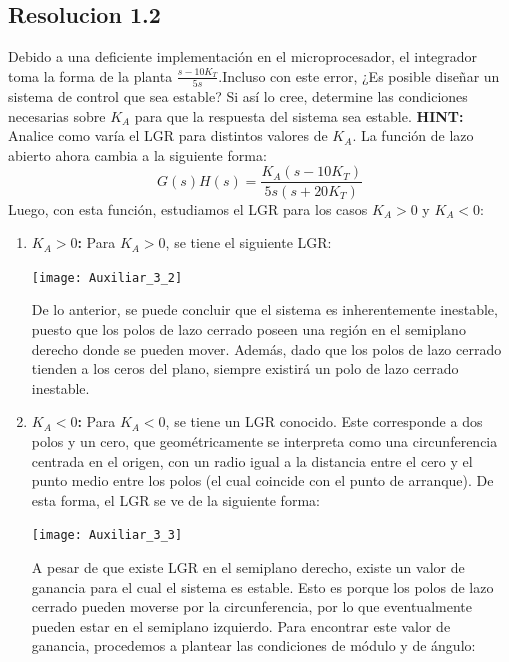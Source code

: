 \documentclass[
  11pt,
  letterpaper,
   addpoints,
   answers
  ]{exam}
\begin{document}
\begin{questions}
\begin{solution}
\section*{Resolucion 1.2}
Debido a una deficiente implementación en el microprocesador, el integrador toma la forma de la planta $\frac{s-10K_T}{5s}$.Incluso con este error, ¿Es posible diseñar un sistema de control que sea estable? Si así lo cree, determine las condiciones necesarias sobre $K_A$ para que la respuesta del sistema sea estable.
\textbf{HINT:} Analice como varía el LGR para distintos valores de $K_A$.
La función de lazo abierto ahora cambia a la siguiente forma:
\begin{equation*}
    G(s)H(s)=\frac{K_A(s-10K_T)}{5s(s+20K_T)}
\end{equation*}
Luego, con esta función, estudiamos el LGR para los casos $K_A>0$ y $K_A<0$:
\begin{enumerate}
    \item \textbf{$K_A>0$:} Para $K_A>0$, se tiene el siguiente LGR:
    \begin{center}
        \texttt{[image: Auxiliar\_3\_2]}
      \end{center}
    De lo anterior, se puede concluir que el sistema es inherentemente inestable, puesto que los polos de lazo cerrado poseen una región en el semiplano derecho donde se pueden mover. Además, dado que los polos de lazo cerrado tienden a los ceros del plano, siempre existirá un polo de lazo cerrado inestable.
    \item \textbf{$K_A<0$:} Para $K_A<0$, se tiene un LGR conocido. Este corresponde a dos polos y un cero, que geométricamente se interpreta como una circunferencia centrada en el origen, con un radio igual a la distancia entre el cero y el punto medio entre los polos (el cual coincide con el punto de arranque). De esta forma, el LGR se ve de la siguiente forma:
    \begin{center}
        \texttt{[image: Auxiliar\_3\_3]}
    \end{center}
    A pesar de que existe LGR en el semiplano derecho, existe un valor de ganancia para el cual el sistema es estable. Esto es porque los polos de lazo cerrado pueden moverse por la circunferencia, por lo que eventualmente pueden estar en el semiplano izquierdo. Para encontrar este valor de ganancia, procedemos a plantear las condiciones de módulo y de ángulo:
    

\end{enumerate}
\end{solution}
\end{questions}
\end{document}
